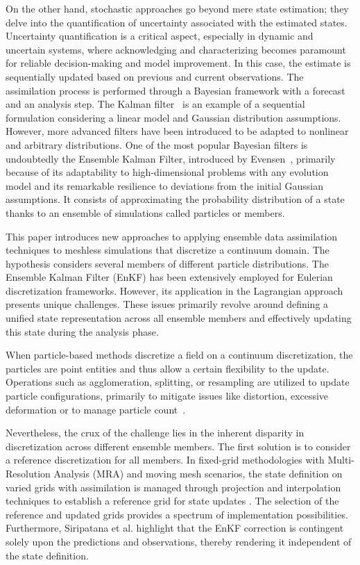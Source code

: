 On the other hand, stochastic approaches go beyond mere state estimation; they delve into the quantification of uncertainty associated with the estimated states. Uncertainty quantification is a critical aspect, especially in dynamic and uncertain systems, where acknowledging and characterizing becomes paramount for reliable decision-making and model improvement. In this case, the estimate is sequentially updated based on previous and current observations. The assimilation process is performed through a Bayesian framework with a forecast and an analysis step. The Kalman filter~\cite{kalman_new_1960} is an example of a sequential formulation considering a linear model and Gaussian distribution assumptions. However, more advanced filters have been introduced to be adapted to nonlinear and arbitrary distributions. One of the most popular Bayesian filters is undoubtedly the Ensemble Kalman Filter, introduced by Evensen~\cite{evensen_sequential_1994}, primarily because of its adaptability to high-dimensional problems with any evolution model and its remarkable resilience to deviations from the initial Gaussian assumptions. It consists of approximating the probability distribution of a state thanks to an ensemble of simulations called particles or members. \newline

This paper introduces new approaches to applying ensemble data assimilation techniques to meshless simulations that discretize a continuum domain. The hypothesis considers several members of different particle distributions. The Ensemble Kalman Filter (EnKF) has been extensively employed for Eulerian discretization frameworks. However, its application in the Lagrangian approach presents unique challenges. These issues primarily revolve around defining a unified state representation across all ensemble members and effectively updating this state during the analysis phase.

When particle-based methods discretize a field on a continuum discretization, the particles are point entities and thus allow a certain flexibility to the update. Operations such as agglomeration, splitting, or resampling are utilized to update particle configurations, primarily to mitigate issues like distortion, excessive deformation or to manage particle count~\cite{yue_continuum_2015,cottet_multi-purpose_1999}.

Nevertheless, the crux of the challenge lies in the inherent disparity in discretization across different ensemble members. The first solution is to consider a reference discretization for all members. In fixed-grid methodologies with Multi-Resolution Analysis (MRA) and moving mesh scenarios, the state definition on varied grids with assimilation is managed through projection and interpolation techniques to establish a reference grid for state updates \cite{siripatana_combining_2019,bonan_data_2017}. The selection of the reference and updated grids provides a spectrum of implementation possibilities. Furthermore, Siripatana et al. \cite{siripatana_combining_2019} highlight that the EnKF correction is contingent solely upon the predictions and observations, thereby rendering it independent of the state definition.

